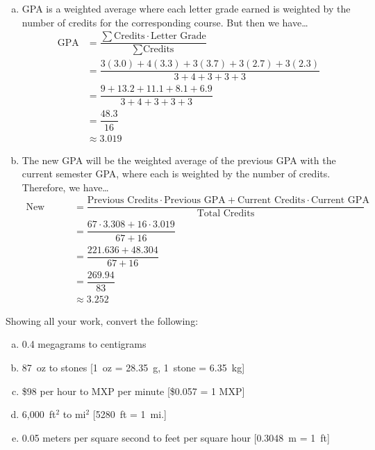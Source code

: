 \documentclass[11pt,letterpaper]{article}
\begin{document}
\sol 
\begin{enumerate}[(a)]
\item GPA is a weighted average where each letter grade earned is weighted by the number of credits for the corresponding course. But then we have\dots
	\[
	\begin{aligned}
	\text{GPA}&= \dfrac{\sum \text{Credits} \cdot \text{Letter Grade}}{\sum \text{Credits}} \\
	&= \dfrac{3(3.0) + 4(3.3) + 3(3.7) + 3(2.7) + 3(2.3)}{3 + 4 + 3 + 3 + 3} \\
	&= \dfrac{9 + 13.2 + 11.1 + 8.1 + 6.9}{3 + 4 + 3 + 3 + 3} \\
	&= \dfrac{48.3}{16} \\
	&\approx 3.019
	\end{aligned}
	\]

\item The new GPA will be the weighted average of the previous GPA with the current semester GPA, where each is weighted by the number of credits. Therefore, we have\dots
	\[
	\begin{aligned}
	\text{New GPA}&= \dfrac{\text{Previous Credits} \cdot \text{Previous GPA} + \text{Current Credits} \cdot \text{Current GPA}}{\text{Total Credits}} \\
	&= \dfrac{67 \cdot 3.308 + 16 \cdot 3.019}{67 + 16} \\
	&= \dfrac{221.636 + 48.304}{67 + 16} \\
	&= \dfrac{269.94}{83} \\
	&\approx 3.252
	\end{aligned}
	\]
\end{enumerate}



\newpage



 Showing all your work, convert the following:
	\begin{enumerate}[(a)]
	\item 0.4 megagrams to centigrams
	\item 87~oz to stones [1~oz = 28.35~g, 1~stone = 6.35~kg]
	\item \$98 per hour to MXP per minute [\$0.057 = 1 MXP]
	\item 6,000~ft$^2$ to mi$^2$ [5280~ft = 1~mi.]
	\item 0.05 meters per square second to feet per square hour [0.3048~m = 1~ft]
	\end{enumerate} \pspace
\end{document}
